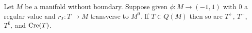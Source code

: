 \begin{comment}
	The lemma itself will also be important when we consider products below in Section \ref{S: products}.

	\begin{lemma}\label{L: pullback with Q}
		Let $M$ be a manifold without boundary.
		Suppose $T \in PC_*^\Gamma(M)$ (or $PC^*_\Gamma(M)$), and that $T \in Q(M)$.
		Then $T \times_M W \in Q(M)$ and $W \times_M T \in Q(M)$ for any $W$ in $PC_*^\Gamma(M)$ (or $PC^*_\Gamma(M)$) that is transverse to $T$.
	\end{lemma}
	\begin{proof}
		We consider only $T \times_M W$ as the arguments for $W \times_M T$ are the same.
		By assumption $T$ is the disjoint union of trivial and degenerate chains, so it suffices to consider independently the possibilities that $T$ is trivial or degenerate.

		If $\rho$ is a (co-)orientation reversing diffeomorphism of $T$ over $M$, then $\rho \times_M \id_W$ is a (co-)orientation reversing diffeomorphism of $T \times_M W$, by Joyce's construction in the oriented case and by Remark \ref{R: co-or restriction or switch} in the co-oriented case.

		Next assume that $T$ is degenerate, so in particular it has small rank.
		Recall that the tangent bundle of a fiber product is the fiber product of the tangent bundles \cite[Theorem 5.47]{Wed16}, and so the derivative is the fiber product of derivatives.
		Note that the fiber product of two linear maps, one with a non-trivial kernel must also have a non-trivial kernel: If $A,B$ are linear maps with a common codomain and $v \in \ker(A)$, then $(v,0)$ is in the kernel of the fiber product of $A$ and $B$.
		So if the differential of $r_W$ has non-trivial kernel everywhere so will the derivative of any fiber product with $r_W$.
		Thus $T \times_M W$ has small rank.

		Next we recall $\bd(T \times_M W) = (\bd T) \times_M W \bigsqcup \pm T \times_M (\bd W)$.
		We have just shown that $T \times_M (\bd W)$ must have small rank.
		As $T$ is degenerate, $\bd T$ is a disjoint of trivial and small rank manifolds over $M$, and so by the preceding arguments $(\bd T) \times_M W$ will be a union of trivial and small rank manifolds over $M$.
		Altogether, $T \times_M W$ is degenerate.
	\end{proof}
\end{comment}

\begin{corollary}\label{C: creasing Q}
	Let $M$ be a manifold without boundary.
	Suppose given $\phi \colon M \to (-1,1)$ with $0$ a regular value and $r_T \colon T \to M$ transverse to $M^0$.
	If $T \in Q(M)$ then so are $T^+$, $T^-$, $T^0$, and $\mathrm{Cre}(T)$.
\end{corollary}

